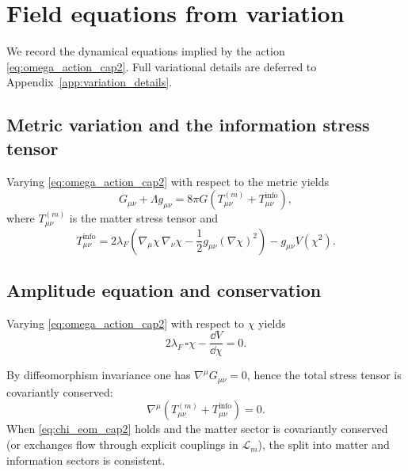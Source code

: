 \section{Field equations from variation}
\label{sec:variational_derivation}

We record the dynamical equations implied by the action \eqref{eq:omega_action_cap2}.
Full variational details are deferred to Appendix~\ref{app:variation_details}.

\subsection{Metric variation and the information stress tensor}
\label{subsec:metric_variation}

\begin{theorem}
\label{thm:einstein_with_info}
Varying \eqref{eq:omega_action_cap2} with respect to the metric yields
\begin{equation}
  G_{\mu\nu}+\Lambda g_{\mu\nu}
  = 8\pi G\left(T^{(m)}_{\mu\nu}+T^{\mathrm{info}}_{\mu\nu}\right),
  \label{eq:einstein_info_cap2}
\end{equation}
where $T^{(m)}_{\mu\nu}$ is the matter stress tensor and
\begin{equation}
  T^{\mathrm{info}}_{\mu\nu}
  = 2\lambda_F\left(\nabla_\mu\chi\,\nabla_\nu\chi-\frac12 g_{\mu\nu}(\nabla\chi)^2\right)
  - g_{\mu\nu}V(\chi^2).
  \label{eq:info_stress_cap2}
\end{equation}
\end{theorem}

\subsection{Amplitude equation and conservation}
\label{subsec:chi_equation}

\begin{proposition}
\label{prop:chi_equation}
Varying \eqref{eq:omega_action_cap2} with respect to $\chi$ yields
\begin{equation}
  2\lambda_F\,\square\chi-\frac{\dd V}{\dd\chi}=0.
  \label{eq:chi_eom_cap2}
\end{equation}
\end{proposition}

By diffeomorphism invariance one has $\nabla^\mu G_{\mu\nu}=0$, hence the total stress tensor is covariantly conserved:
\begin{equation}
  \nabla^\mu\left(T^{(m)}_{\mu\nu}+T^{\mathrm{info}}_{\mu\nu}\right)=0.
  \label{eq:stress_conservation_cap2}
\end{equation}
When \eqref{eq:chi_eom_cap2} holds and the matter sector is covariantly conserved (or exchanges flow through explicit couplings in $\mathcal{L}_m$), the split into matter and information sectors is consistent.

